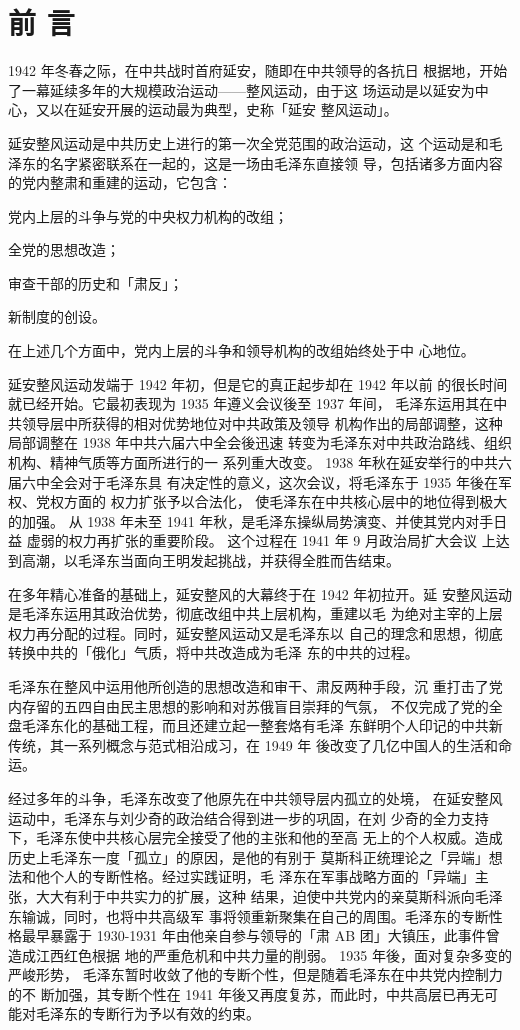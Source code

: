 
\chapter*{前\hspace{\ccwd} 言}
\begin{fzliukai}
1942 年冬春之际，在中共战时首府延安，随即在中共领导的各抗日
根据地，开始了一幕延续多年的大规模政治运动——整风运动，由于这
场运动是以延安为中心，又以在延安开展的运动最为典型，史称「延安
整风运动」。

延安整风运动是中共历史上进行的第一次全党范围的政治运动，这
个运动是和毛泽东的名字紧密联系在一起的，这是一场由毛泽东直接领
导，包括诸多方面内容的党内整肃和重建的运动，它包含：

党内上层的斗争与党的中央权力机构的改组；

全党的思想改造；

审查干部的历史和「肃反」；

新制度的创设。

在上述几个方面中，党内上层的斗争和领导机构的改组始终处于中
心地位。

延安整风运动发端于 1942 年初，但是它的真正起步却在 1942 年以前
的很长时间就已经开始。它最初表现为 1935 年遵义会议後至 1937 年间，
毛泽东运用其在中共领导层中所获得的相对优势地位对中共政策及领导
机构作出的局部调整，这种局部调整在 1938 年中共六届六中全会後迅速
转变为毛泽东对中共政治路线、组织机构、精神气质等方面所进行的一
系列重大改变。 1938 年秋在延安举行的中共六届六中全会对于毛泽东具
有决定性的意义，这次会议，将毛泽东于 1935 年後在军权、党权方面的
权力扩张予以合法化，
使毛泽东在中共核心层中的地位得到极大的加强。
从 1938 年未至 1941 年秋，是毛泽东操纵局势演变、并使其党内对手日益
虚弱的权力再扩张的重要阶段。
这个过程在 1941 年 9 月政治局扩大会议
上达到高潮，以毛泽东当面向王明发起挑战，并获得全胜而告结束。

在多年精心准备的基础上，延安整风的大幕终于在 1942 年初拉开。延
安整风运动是毛泽东运用其政治优势，彻底改组中共上层机构，重建以毛
为绝对主宰的上层权力再分配的过程。同时，延安整风运动又是毛泽东以
自己的理念和思想，彻底转换中共的「俄化」气质，将中共改造成为毛泽
东的中共的过程。

毛泽东在整风中运用他所创造的思想改造和审干、肃反两种手段，沉
重打击了党内存留的五四自由民主思想的影响和对苏俄盲目崇拜的气氛，
不仅完成了党的全盘毛泽东化的基础工程，而且还建立起一整套烙有毛泽
东鲜明个人印记的中共新传统，其一系列概念与范式相沿成习，在 1949 年
後改变了几亿中国人的生活和命运。

经过多年的斗争，毛泽东改变了他原先在中共领导层内孤立的处境，
在延安整风运动中，毛泽东与刘少奇的政治结合得到进一步的巩固，在刘
少奇的全力支持下，毛泽东使中共核心层完全接受了他的主张和他的至高
无上的个人权威。造成历史上毛泽东一度「孤立」的原因，是他的有别于
莫斯科正统理论之「异端」想法和他个人的专断性格。经过实践证明，毛
泽东在军事战略方面的「异端」主张，大大有利于中共实力的扩展，这种
结果，迫使中共党内的亲莫斯科派向毛泽东输诚，同时，也将中共高级军
事将领重新聚集在自己的周围。毛泽东的专断性格最早暴露于 1930-1931
年由他亲自参与领导的「肃 AB 团」大镇压，此事件曾造成江西红色根据
地的严重危机和中共力量的削弱。 1935 年後，面对复杂多变的严峻形势，
毛泽东暂时收敛了他的专断个性，但是随着毛泽东在中共党内控制力的不
断加强，其专断个性在 1941 年後又再度复苏，而此时，中共高层已再无可
能对毛泽东的专断行为予以有效的约束。


\end{fzliukai}
